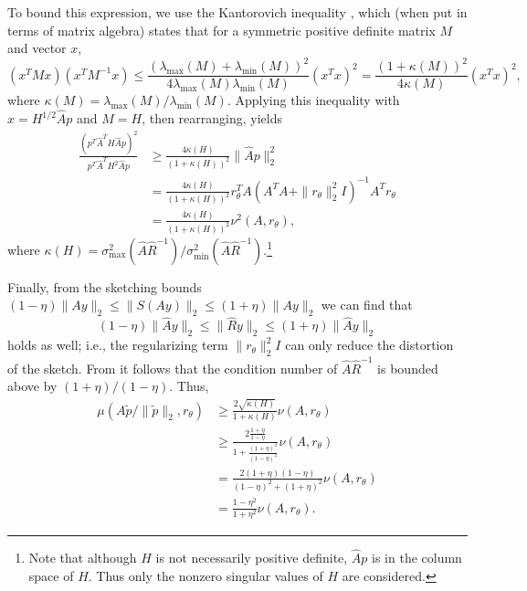 \documentclass{article}
\newcommand{\ts}{^T}
\begin{document}
To bound this expression, we use the Kantorovich inequality \cite{henrici1961two}, which (when put in terms of matrix algebra) states that for a symmetric positive definite matrix $M$ and vector $x$,
\begin{equation*}
    (x\ts M x)(x\ts M^{-1}x) \leq \frac{(\lambda_{\max}(M)+\lambda_{\min}(M))^2}{4\lambda_{\max}(M)\lambda_{\min}(M)}(x\ts x)^2 = \frac{(1+\kappa(M))^2}{4\kappa(M)}(x\ts x)^2,
\end{equation*}
where $\kappa(M) = \lambda_{\max}(M)/\lambda_{\min}(M)$. Applying this inequality with $x = H^{1/2}\hat{A}p$ and $M = H$, then rearranging, yields
\begin{align*}
    \frac{\left(p\ts\hat{A}\ts H \hat{A}p\right)^2}{p\ts\hat{A}\ts H^2 \hat{A}p}
    &\geq \frac{4\kappa(H)}{(1+\kappa(H))^2}\|\hat{A}p\|_2^2 \\
    &= \frac{4\kappa(H)}{(1+\kappa(H))^2}r_\theta\ts A (A\ts A+\|r_\theta\|_2^2I)^{-1}A\ts r_\theta \\
    &= \frac{4\kappa(H)}{(1+\kappa(H))^2} \nu^2(A, r_\theta),
\end{align*}
where $\kappa(H) = \sigma_{\max}^2(\hat{A}\hat{R}^{-1})/\sigma_{\min}^2(\hat{A}\hat{R}^{-1})$.\footnote{Note that although $H$ is not necessarily positive definite, $\hat{A}p$ is in the column space of $H$. Thus only the nonzero singular values of $H$ are considered.}

Finally, from the sketching bounds $(1-\eta)\|Ay\|_2 \leq \|S(Ay)\|_2 \leq (1+\eta)\|Ay\|_2$ we can find that
\begin{equation*}
    (1-\eta)\|\hat{A}y\|_2 \leq \|\hat{R}y\|_2 \leq (1+\eta)\|\hat{A}y\|_2
\end{equation*}
holds as well; i.e., the regularizing term $\|r_\theta\|_2^2I$ can only reduce the distortion of the sketch. From \cite[Fact 2.2]{epperly2026fast} it follows that the condition number of $\hat{A}\hat{R}^{-1}$ is bounded above by $(1+\eta)/(1-\eta)$. Thus, 
\begin{align*}
    \mu(A\widetilde{p}/\|\widetilde{p}\|_2, r_\theta) &\geq
    \frac{2\sqrt{\kappa(H)}}{1+\kappa(H)} \nu(A, r_\theta)\\
    &\geq \frac{2\frac{1+\eta}{1-\eta}}{1 + \frac{(1+\eta)^2}{(1-\eta)^2}}\nu(A, r_\theta) \\
    &= \frac{2(1+\eta)(1-\eta)}{(1-\eta)^2 + (1+\eta)^2}\nu(A, r_\theta)\\
    &= \frac{1 - \eta^2}{1+\eta^2}\nu(A, r_\theta).
\end{align*}
\end{document}

